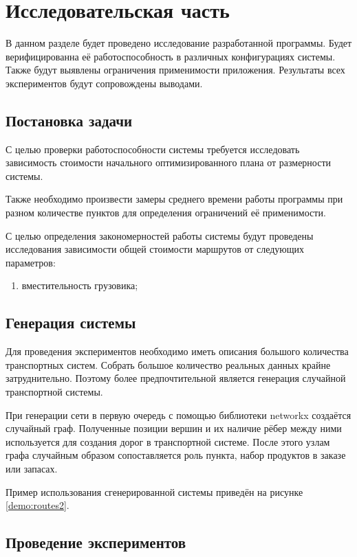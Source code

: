 \section{Исследовательская часть}

В данном разделе будет проведено исследование разработанной программы. Будет верифицированна её работоспособность в различных конфигурациях системы. Также будут выявлены ограничения применимости приложения. Результаты всех экспериментов будут сопровождены выводами.  

\subsection{Постановка задачи}
С целью проверки работоспособности системы требуется исследовать зависимость стоимости начального оптимизированного плана от размерности системы.

Также необходимо произвести замеры среднего времени работы программы при разном количестве пунктов для определения ограничений её применимости.

С целью определения закономерностей работы системы будут проведены исследования зависимости общей стоимости маршрутов от следующих параметров:

\begin{enumerate}
	\item вместительность грузовика;	
\end{enumerate}

\subsection{Генерация системы}
Для проведения экспериментов необходимо иметь описания большого количества транспортных систем. Собрать большое количество реальных данных крайне затруднительно. Поэтому более предпочтительной является генерация случайной транспортной системы.

При генерации сети в первую очередь с помощью библиотеки networkx создаётся случайный граф. Полученные позиции вершин и их наличие рёбер между ними используется для создания дорог в транспортной системе. После этого узлам графа случайным образом сопоставляется роль пункта, набор продуктов в заказе или запасах.

Пример использования сгенерированной системы приведён на рисунке \ref{demo:routes2}.

\subsection{Проведение экспериментов}

